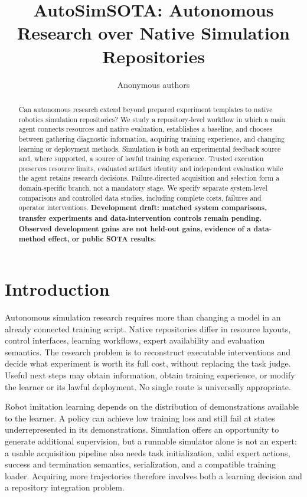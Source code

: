\documentclass[10pt,twocolumn,letterpaper]{article}
\title{AutoSimSOTA: Autonomous Research over Native Simulation Repositories}
\author{Anonymous authors}
\begin{document}
\maketitle
\begin{abstract}
Can autonomous research extend beyond prepared experiment templates to native
robotics simulation repositories? We study a repository-level workflow in which
a main agent connects resources and native evaluation, establishes a baseline,
and chooses between gathering diagnostic information, acquiring training
experience, and changing learning or deployment methods. Simulation is both an
experimental feedback source and, where supported, a source of lawful training
experience. Trusted execution preserves resource limits, evaluated artifact
identity and independent evaluation while the agent retains research decisions.
Failure-directed acquisition and selection form a domain-specific branch, not a
mandatory stage. We specify separate system-level comparisons and controlled
data studies, including complete costs, failures and operator interventions.
\textbf{Development draft: matched system comparisons, transfer experiments and
data-intervention controls remain pending. Observed development gains are not
held-out gains, evidence of a data-method effect, or public SOTA results.}
\end{abstract}

\section{Introduction}
Autonomous simulation research requires more than changing a model in an already
connected training script. Native repositories differ in resource layouts,
control interfaces, learning workflows, expert availability and evaluation
semantics. The research problem is to reconstruct executable interventions and
decide what experiment is worth its full cost, without replacing the task judge.
Useful next steps may obtain information, obtain training experience, or modify
the learner or its lawful deployment. No single route is universally appropriate.

Robot imitation learning depends on the distribution of demonstrations available
to the learner. A policy can achieve low training loss and still fail at states
underrepresented in its demonstrations. Simulation offers an opportunity to
generate additional supervision, but a runnable simulator alone is not an expert:
a usable acquisition pipeline also needs task initialization, valid expert actions,
success and termination semantics, serialization, and a compatible training loader.
Acquiring more trajectories therefore involves both a learning decision and a
repository integration problem.
\end{document}

